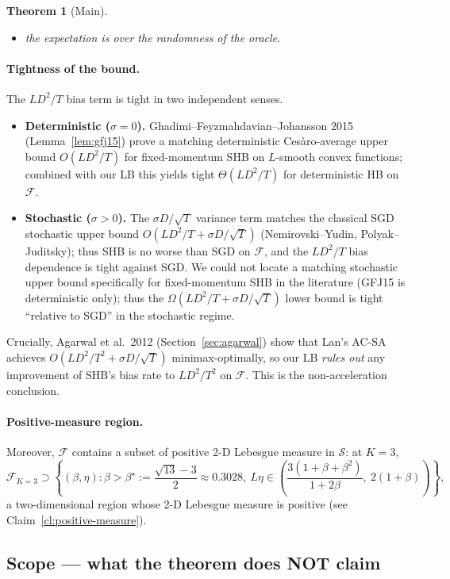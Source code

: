 \documentclass[11pt]{article}
\newtheorem{theorem}{Theorem}[section]
\theoremstyle{definition}
\theoremstyle{remark}
\begin{document}
\begin{theorem}[Main]
\begin{itemize}
\item the expectation is over the randomness of the oracle.
\end{itemize}
\end{theorem}

\paragraph{Tightness of the bound.} The $LD^2/T$ bias term is tight in two independent senses.
\begin{itemize}
\item \textbf{Deterministic ($\sigma=0$).} Ghadimi--Feyzmahdavian--Johansson 2015 (Lemma~\ref{lem:gfj15}) prove a matching deterministic Ces\`aro-average upper bound $O(LD^2/T)$ for fixed-momentum SHB on $L$-smooth convex functions; combined with our LB this yields tight $\Theta(LD^2/T)$ for deterministic HB on $\mathcal{F}$.
\item \textbf{Stochastic ($\sigma>0$).} The $\sigma D/\sqrt T$ variance term matches the classical SGD stochastic upper bound $O(LD^2/T + \sigma D/\sqrt T)$ (Nemirovski--Yudin, Polyak--Juditsky); thus SHB is no worse than SGD on $\mathcal{F}$, and the $LD^2/T$ bias dependence is tight against SGD. We could not locate a matching stochastic upper bound specifically for fixed-momentum SHB in the literature (GFJ15 is deterministic only); thus the $\Omega(LD^2/T + \sigma D/\sqrt T)$ lower bound is tight ``relative to SGD'' in the stochastic regime.
\end{itemize}
Crucially, Agarwal et al.\ 2012 (Section~\ref{sec:agarwal}) show that Lan's AC-SA achieves $O(LD^2/T^2 + \sigma D/\sqrt T)$ minimax-optimally, so our LB \emph{rules out} any improvement of SHB's bias rate to $LD^2/T^2$ on $\mathcal{F}$. This is the non-acceleration conclusion.

\paragraph{Positive-measure region.} Moreover, $\mathcal{F}$ contains a subset of positive 2-D Lebesgue measure in $\mathcal{S}$: at $K = 3$,
\[
  \mathcal{F}_{K=3} \supset \left\{(\beta,\eta) : \beta > \beta^\star := \frac{\sqrt{13} - 3}{2} \approx 0.3028,\ L\eta \in \left(\frac{3(1 + \beta + \beta^2)}{1 + 2\beta},\ 2(1+\beta)\right)\right\},
\]
a two-dimensional region whose 2-D Lebesgue measure is positive (see Claim~\ref{cl:positive-measure}).

\subsection{Scope --- what the theorem does NOT claim}
\end{document}
